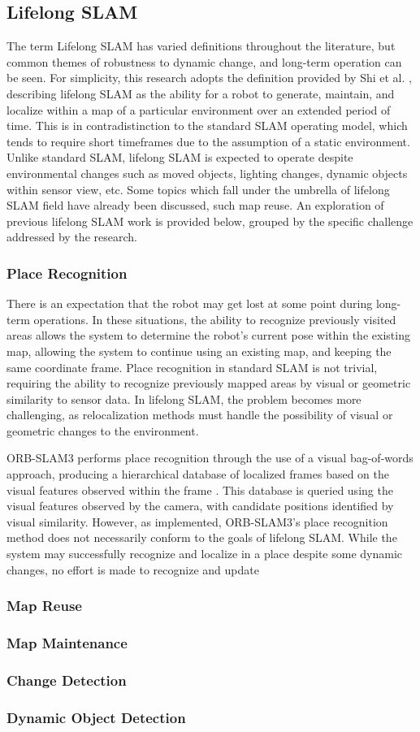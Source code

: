 \subsection{Lifelong SLAM}

The term Lifelong SLAM has varied definitions throughout the literature, but common themes of robustness to dynamic change, and long-term operation can be seen. For simplicity, this research adopts the definition provided by Shi et al. \cite{shiAreWeReady2020}, describing lifelong SLAM as the ability for a robot to generate, maintain, and localize within a map of a particular environment over an extended period of time. This is in contradistinction to the standard SLAM operating model, which tends to require short timeframes due to the assumption of a static environment. Unlike standard SLAM, lifelong SLAM is expected to operate despite environmental changes such as moved objects, lighting changes, dynamic objects within sensor view, etc. Some topics which fall under the umbrella of lifelong SLAM field have already been discussed, such map reuse. An exploration of previous lifelong SLAM work is provided below, grouped by the specific challenge addressed by the research.

\subsubsection{Place Recognition}

There is an expectation that the robot may get lost at some point during long-term operations. In these situations, the ability to recognize previously visited areas allows the system to determine the robot's current pose within the existing map, allowing the system to continue using an existing map, and keeping the same coordinate frame. Place recognition in standard SLAM is not trivial, requiring the ability to recognize previously mapped areas by visual or geometric similarity to sensor data. In lifelong SLAM, the problem becomes more challenging, as relocalization methods must handle the possibility of visual or geometric changes to the environment.

ORB-SLAM3 performs place recognition through the use of a visual bag-of-words approach, producing a hierarchical database of localized frames based on the visual features observed within the frame \cite{camposORBSLAM3AccurateOpenSource2021}\cite{galvez-lopezBagsBinaryWords2012}. This database is queried using the visual features observed by the camera, with candidate positions identified by visual similarity. However, as implemented, ORB-SLAM3's place recognition method does not necessarily conform to the goals of lifelong SLAM. While the system may successfully recognize and localize in a place despite some dynamic changes, no effort is made to recognize and update 

\subsubsection{Map Reuse}
\subsubsection{Map Maintenance}
\subsubsection{Change Detection}
\subsubsection{Dynamic Object Detection}
